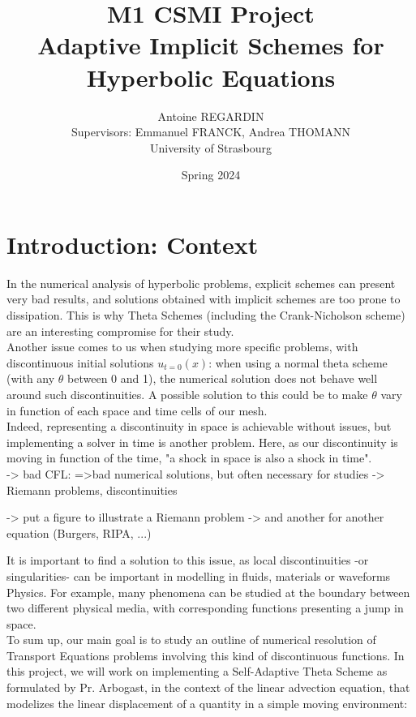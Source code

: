 \documentclass[12pt]{article}
\begin{document}
\def\spacingset#1{\renewcommand{\baselinestretch}%
{#1}\small\normalsize} \spacingset{1}

\title{\bf M1 CSMI Project\\ Adaptive Implicit Schemes for Hyperbolic Equations}
\author{Antoine REGARDIN\hspace{.2cm}\\
    Supervisors: Emmanuel FRANCK, Andrea THOMANN\\
    University of Strasbourg\\ }
\date{Spring 2024}
\maketitle

\tableofcontents

\newpage

\section{Introduction: Context}
In the numerical analysis of hyperbolic problems, explicit schemes can present very bad results, and solutions obtained with implicit schemes
are too prone to dissipation. This is why Theta Schemes (including the Crank-Nicholson scheme) are an interesting compromise for their study.\\
Another issue comes to us when studying more specific problems, with discontinuous initial solutions $u_{t=0}(x)$: when using a normal theta scheme (with any $\theta$ between 0 and 1),
the numerical solution does not behave well around such discontinuities. A possible solution to this could be to make $\theta$ vary in function of each space and time cells of our mesh.\\
Indeed, representing a discontinuity in space is achievable without issues, but implementing a solver in time is another problem.
Here, as our discontinuity is moving in function of the time, "a shock in space is also a shock in time".\\
-> bad CFL: =>bad numerical solutions, but often necessary for studies
-> Riemann problems, discontinuities


-> put a figure to illustrate a Riemann problem
-> and another for another equation (Burgers, RIPA, ...)


It is important to find a solution to this issue, as local discontinuities -or singularities- can be important in modelling in fluids, materials or waveforms Physics.
For example, many phenomena can be studied at the boundary between two different physical media,
with corresponding functions presenting a jump in space.\\
To sum up, our main goal is to study an outline of numerical resolution of Transport Equations problems
involving this kind of discontinuous functions. In this project, we will work on implementing a Self-Adaptive Theta Scheme as formulated by Pr. Arbogast, 
in the context of the linear advection equation, that modelizes the linear displacement of a quantity in a simple moving environment:
\end{document}
